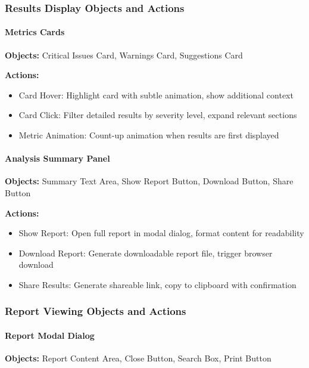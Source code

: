 \documentclass[12pt,a4paper]{article}
\begin{document}
    \subsubsection{Results Display Objects and Actions}

    \paragraph{Metrics Cards}
    \textbf{Objects:} Critical Issues Card, Warnings Card, Suggestions Card

    \textbf{Actions:}
    \begin{itemize}[leftmargin=0.5in]
        \item Card Hover: Highlight card with subtle animation, show additional context
        \item Card Click: Filter detailed results by severity level, expand relevant sections
        \item Metric Animation: Count-up animation when results are first displayed
    \end{itemize}

    \paragraph{Analysis Summary Panel}
    \textbf{Objects:} Summary Text Area, Show Report Button, Download Button, Share Button

    \textbf{Actions:}
    \begin{itemize}[leftmargin=0.5in]
        \item Show Report: Open full report in modal dialog, format content for readability
        \item Download Report: Generate downloadable report file, trigger browser download
        \item Share Results: Generate shareable link, copy to clipboard with confirmation
    \end{itemize}

    \subsubsection{Report Viewing Objects and Actions}

    \paragraph{Report Modal Dialog}
    \textbf{Objects:} Report Content Area, Close Button, Search Box, Print Button
\end{document}
